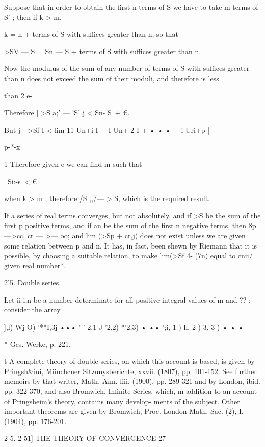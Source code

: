 Suppose that in order to obtain the first n terms of S we have to take 
m terms of S' ; then if k > m, 

 k =  n + terms of S with suffices greater than n, 
so that 

>SV — S = Sn — S + terms of S with suffices greater than n. 

Now the modulus of the sum of any number of terms of S with suffices 
greater than n does not exceed the sum of their moduli, and therefore is less 

than 2 e- 

Therefore | >S a;' — 'S' j < Sn- S\ +  €. 

But j    - >Sf I < lim 11 Un+i I + I Un+-2 I + • • • + i Uri+p |   

p-*-x 

1 
Therefore given e we can find m such that 

\ Si:-s\ < € 

when k > m ; therefore /S ,,/— > S, which is the required result. 

If a series of real terms converges, but not absolutely, and if >S  be the 
sum of the first p positive terms, and if an be the sum of the first n negative 
terms, then 8p—>cc, cr — >— oo; and lim (>Sp + cr,j) does not exist unless we 
are given some relation between p and n. It has, in fact, been shewn by 
Riemann that it is possible, by choosing a suitable relation, to make 
lim(>Sf 4- (7n) equal to cnii/ given real number*. 

2'5. Double series.  

Let ii i,n be a number determinate for all positive integral values of m 
and ?? ; consider the array 

 ],l) Wj O) '**I,3j ••• 
' ' 2,1 J  '2,2) *'2,3) • •• 
 ';i, 1 )  h, 2 )  3, 3 ) • • • 



* Ges. Werke, p. 221. 

t A complete theory of double series, on which this account is based, is given by Pringsh\&iui, 
Miinchcner Sitzunysberichte, xxvii. (1807), pp. 101-152. See further memoirs by that writer, 
Math. Ann. liii. (1900), pp. 289-321 and by London, ibid. pp. 322-370, and also Bromwich, 
Infinite Series, which, m addition to an account of Pringsheim's theory, contains many develop- 
ments of the subject. Other important theorems are given by Bromwich, Proc. London Math. 
Sac. (2), I. (1904), pp. 176-201. 



2-5, 2-51] THE THEORY OF CONVERGENCE 27 


